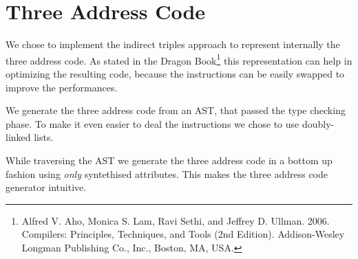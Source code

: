 \section{Three Address Code}
We chose to implement the indirect triples approach to represent internally
the three address code. As stated in the Dragon Book\footnote{Alfred V. Aho,
Monica S. Lam, Ravi Sethi, and Jeffrey D. Ullman. 2006. Compilers: Principles,
Techniques, and Tools (2nd Edition). Addison-Wesley Longman Publishing Co.,
Inc., Boston, MA, USA.} this representation
can help in optimizing the resulting code, because the instructions can be
easily swapped to improve the performances.

We generate the three address code from an AST, that passed the type checking
phase. To make it even easier to deal the instructions we chose to use
doubly-linked lists.

While traversing the AST we generate the three address code in a bottom up
fashion using \emph{only} syntethised attributes. This makes the three address
code generator intuitive.

